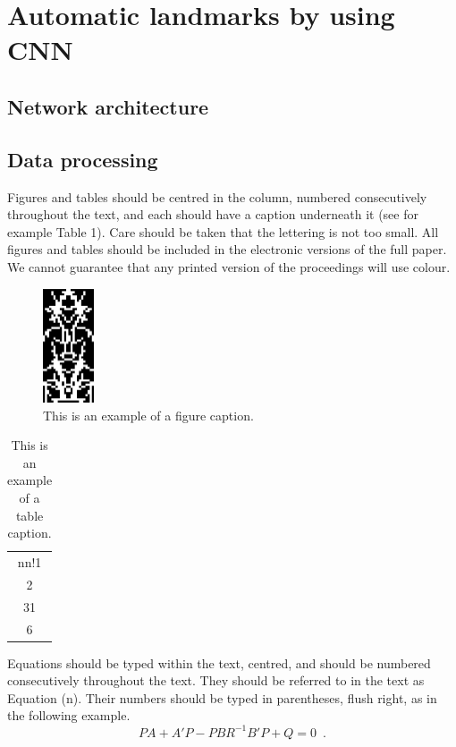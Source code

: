 \documentclass[10pt]{article}
\begin{document}
\section{Automatic landmarks by using CNN}
\subsection{Network architecture}

\subsection{Data processing}
Figures and tables should be centred in the column, numbered
consecutively throughout the text, and each should have a
caption underneath it (see for example Table 1). Care should
be taken that the lettering is not too small. All figures and
tables should be included in the electronic versions of the full
paper. We cannot guarantee that any printed version of the
proceedings will use colour.


\begin{figure}[h]
\centering
\includegraphics[width=1.5cm]{images/fig1}
\caption{\label{tab1}This is an example of a figure caption.} 
\end{figure}


\begin{table}[h]
\begin{center}

\begin{tabular}{c}
nn!1 \\
2 \\
31 \\
6 \\
\end{tabular}
\end{center}
\caption{\label{tab1}This is an example of a table caption.}
\end{table}

Equations should be typed within the text, centred, and should
be numbered consecutively throughout the text. They should
be referred to in the text as Equation (n). Their numbers
should be typed in parentheses, flush right, as in the following
example.
\begin{equation}
	    PA + A'P - PBR^{-1}B'P + Q  =  0 \enspace.
\end{equation}
\end{document}
